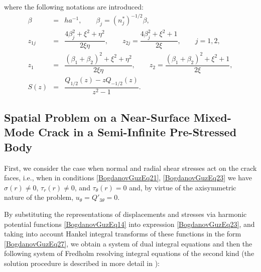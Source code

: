 %
where the following notations are introduced:
\begin{equation}
	\label{BogdanovGuzEq35}
	\begin{array}{rcl}
		\beta &=& ha^{-1}, 
		\qquad 
		\beta_{j}=(n_{j}^{*})^{-1/2}\beta,
		\\[4pt]
		
		z_{1j} &=& \dfrac{4\beta_{j}^{2}+\xi^{2}+\eta^{2}}{2\xi\eta},
		\qquad
		z_{2j}=\dfrac{4\beta_{j}^{2}+\xi^{2}+1}{2\xi},
		\qquad j=1,2,
		\\[6pt]
		
		z_{1} &=& \dfrac{(\beta_{1}+\beta_{2})^{2}+\xi^{2}+\eta^{2}}{2\xi\eta},
		\qquad
		z_{2}=\dfrac{(\beta_{1}+\beta_{2})^{2}+\xi^{2}+1}{2\xi},
		\\[8pt]
		
		S(z) &=& \dfrac{Q_{1/2}(z)-zQ_{-1/2}(z)}{z^{2}-1}.
	\end{array}
\end{equation}

\subsection{Spatial Problem on a Near-Surface Mixed-Mode Crack in a	Semi-Infinite Pre-Stressed Body}

First, we consider the case when normal and radial shear stresses act on the crack faces, i.e., when in conditions \eqref{BogdanovGuzEq21}, \eqref{BogdanovGuzEq23} we have
$\sigma(r)\neq0$, $\tau_r(r)\neq0$, and $\tau_\theta(r)=0$ and, by virtue of the axisymmetric nature of the problem, $u_\theta=Q'_{3\theta}=0$.

By substituting the representations of displacements and stresses via harmonic potential functions \eqref{BogdanovGuzEq14} into expression \eqref{BogdanovGuzEq23}, and taking into account Hankel integral transforms of these functions in the form \eqref{BogdanovGuzEq27}, we obtain a system of dual integral equations and then the following system of Fredholm resolving integral equations of the second kind (the solution procedure is described in more detail in \cite{BogdanovGuz32}):

